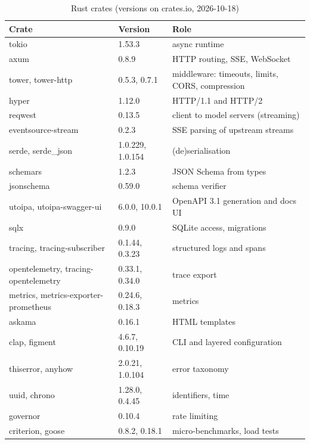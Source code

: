\begin{table}[t]
\caption{Rust crates (versions on crates.io, 2026-10-18)}
\label{tab:crates}
\centering\scriptsize
\begin{tabular}{@{}p{2.6cm}p{1.6cm}p{3.6cm}@{}}
\toprule
Crate & Version & Role \\
\midrule
tokio & 1.53.3 & async runtime \\
axum & 0.8.9 & HTTP routing, SSE, WebSocket \\
tower, tower-http & 0.5.3, 0.7.1 & middleware: timeouts, limits, CORS, compression \\
hyper & 1.12.0 & HTTP/1.1 and HTTP/2 \\
reqwest & 0.13.5 & client to model servers (streaming) \\
eventsource-stream & 0.2.3 & SSE parsing of upstream streams \\
serde, serde\_json & 1.0.229, 1.0.154 & (de)serialisation \\
schemars & 1.2.3 & JSON Schema from types \\
jsonschema & 0.59.0 & schema verifier \\
utoipa, utoipa-\allowbreak swagger-ui & 6.0.0, 10.0.1 & OpenAPI 3.1 generation and docs UI \\
sqlx & 0.9.0 & SQLite access, migrations \\
tracing, tracing-subscriber & 0.1.44, 0.3.23 & structured logs and spans \\
opentelemetry, tracing-\allowbreak opentelemetry & 0.33.1, 0.34.0 & trace export \\
metrics, metrics-\allowbreak exporter-\allowbreak prometheus & 0.24.6, 0.18.3 & metrics \\
askama & 0.16.1 & HTML templates \\
clap, figment & 4.6.7, 0.10.19 & CLI and layered configuration \\
thiserror, anyhow & 2.0.21, 1.0.104 & error taxonomy \\
uuid, chrono & 1.28.0, 0.4.45 & identifiers, time \\
governor & 0.10.4 & rate limiting \\
criterion, goose & 0.8.2, 0.18.1 & micro-benchmarks, load tests \\
\bottomrule
\end{tabular}
\end{table}

